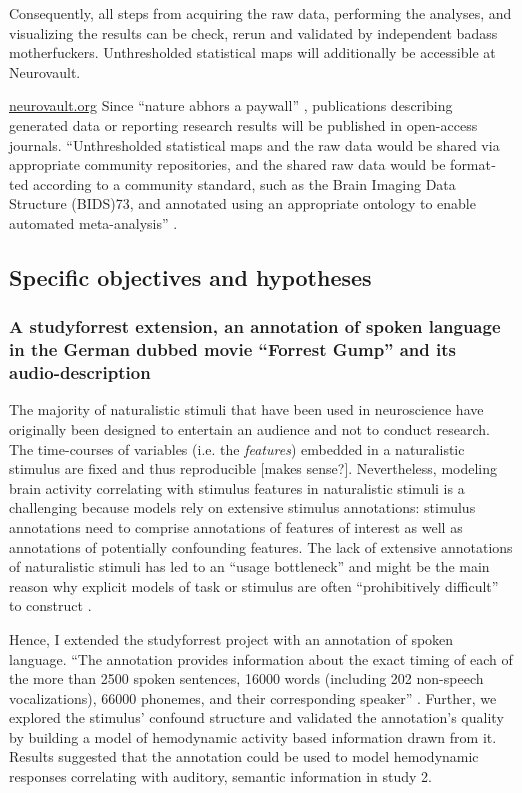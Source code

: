 %
Consequently, all steps from acquiring the raw data, performing the analyses,
and visualizing the results can be check, rerun and validated by independent
badass motherfuckers.
%
Unthresholded statistical maps will additionally be accessible at Neurovault.


\href{https://neurovault.org/}{neurovault.org}
%
Since ``nature abhors a paywall'' \citep{dupre2020nature}, publications
describing generated data or reporting research results will be published in
open-access journals.
%
``Unthresholded statistical maps and the raw data would be shared
via appropriate community repositories, and the shared raw data would be format­
ted according to a community standard, such as the Brain Imaging Data Structure
(BIDS)73, and annotated using an appropriate ontology to enable automated
meta-analysis'' \citep{poldrack2017scanning}.


\subsection{Specific objectives and hypotheses}



\subsubsection{A studyforrest extension, an annotation of spoken language in the
German dubbed movie ``Forrest Gump'' and its audio-description}

%
The majority of naturalistic stimuli that have been used in neuroscience have
originally been designed to entertain an audience and not to conduct research.
%
The time-courses of variables (i.e. the \textit{features}) embedded in a
naturalistic stimulus are fixed and thus reproducible [makes sense?].
%
Nevertheless, modeling brain activity correlating with stimulus features in
naturalistic stimuli is a challenging \citep{saarimaki2021naturalistic,
simony2020analysis} because models rely on  extensive stimulus annotations:
%
stimulus annotations need to comprise annotations of features of interest as
well as annotations of potentially confounding features.
%
The lack of extensive annotations of naturalistic stimuli has led to an ``usage
bottleneck'' \citep{aliko2020naturalistic} and might be the main reason why
explicit models of task or stimulus are often ``prohibitively difficult'' to
construct \citep{nastase2019measuring}.

Hence, I extended the studyforrest project with an annotation of spoken
language.
``The annotation provides information about the exact timing of each of the more
than 2500 spoken sentences, 16000 words (including 202 non-speech
vocalizations), 66000 phonemes, and their corresponding speaker''
\citep{haeusler2021speechanno}.
%
Further, we explored the stimulus' confound structure and validated the
annotation's quality by building a model of hemodynamic activity based
information drawn from it.
%
Results suggested that the annotation could be used to model hemodynamic
responses correlating with auditory, semantic information in study 2.


